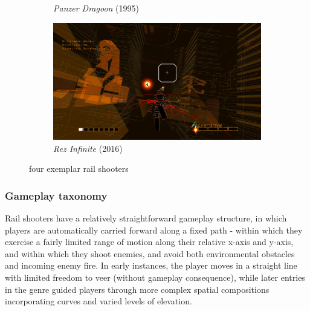 \documentclass[11pt]{article}
\begin{document}
\begin{figure}[h]
\begin{subfigure}{.5\textwidth}
  \caption{\textit{Panzer Dragoon} (1995)}
  \label{fig:sfig3}
\end{subfigure}
\begin{subfigure}{.5\textwidth}
  \centering
  \includegraphics[width=.8\linewidth]{rez}
  \caption{\textit{Rez Infinite} (2016)}
  \label{fig:sfig4}
\end{subfigure}
\caption{four exemplar rail shooters}
\label{fig:history}
\end{figure}

\subsubsection*{Gameplay taxonomy}

Rail shooters have a relatively straightforward gameplay structure, in which players are
automatically carried forward along a fixed path - within which they exercise a fairly
limited range of motion along their relative x-axis and y-axis, and within which they
shoot enemies, and avoid both environmental obstacles and incoming enemy fire. In early instances,
the player moves in a straight line with limited freedom to veer (without gameplay consequence),
while later entries in the genre guided players through more complex spatial compositions incorporating
curves and varied levels of elevation.
\end{document}
